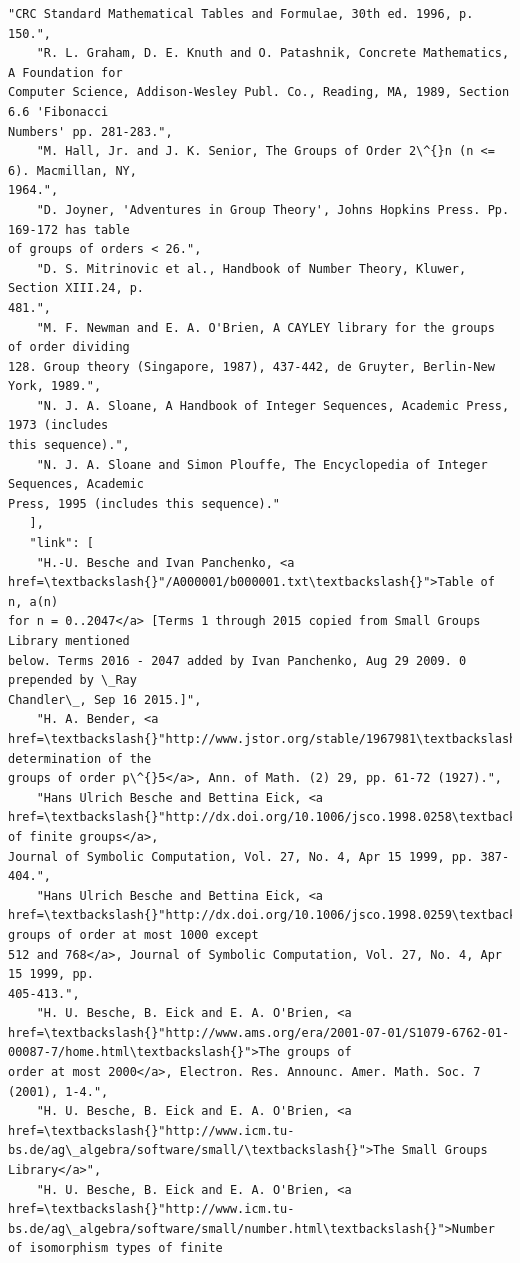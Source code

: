 \documentclass[11pt]{article}
\begin{document}
\begin{Verbatim}[commandchars=\\\{\}]
    "CRC Standard Mathematical Tables and Formulae, 30th ed. 1996, p. 150.",
    "R. L. Graham, D. E. Knuth and O. Patashnik, Concrete Mathematics, A Foundation for
Computer Science, Addison-Wesley Publ. Co., Reading, MA, 1989, Section 6.6 'Fibonacci
Numbers' pp. 281-283.",
    "M. Hall, Jr. and J. K. Senior, The Groups of Order 2\^{}n (n <= 6). Macmillan, NY,
1964.",
    "D. Joyner, 'Adventures in Group Theory', Johns Hopkins Press. Pp. 169-172 has table
of groups of orders < 26.",
    "D. S. Mitrinovic et al., Handbook of Number Theory, Kluwer, Section XIII.24, p.
481.",
    "M. F. Newman and E. A. O'Brien, A CAYLEY library for the groups of order dividing
128. Group theory (Singapore, 1987), 437-442, de Gruyter, Berlin-New York, 1989.",
    "N. J. A. Sloane, A Handbook of Integer Sequences, Academic Press, 1973 (includes
this sequence).",
    "N. J. A. Sloane and Simon Plouffe, The Encyclopedia of Integer Sequences, Academic
Press, 1995 (includes this sequence)."
   ],
   "link": [
    "H.-U. Besche and Ivan Panchenko, <a href=\textbackslash{}"/A000001/b000001.txt\textbackslash{}">Table of n, a(n)
for n = 0..2047</a> [Terms 1 through 2015 copied from Small Groups Library mentioned
below. Terms 2016 - 2047 added by Ivan Panchenko, Aug 29 2009. 0 prepended by \_Ray
Chandler\_, Sep 16 2015.]",
    "H. A. Bender, <a href=\textbackslash{}"http://www.jstor.org/stable/1967981\textbackslash{}">A determination of the
groups of order p\^{}5</a>, Ann. of Math. (2) 29, pp. 61-72 (1927).",
    "Hans Ulrich Besche and Bettina Eick, <a
href=\textbackslash{}"http://dx.doi.org/10.1006/jsco.1998.0258\textbackslash{}">Construction of finite groups</a>,
Journal of Symbolic Computation, Vol. 27, No. 4, Apr 15 1999, pp. 387-404.",
    "Hans Ulrich Besche and Bettina Eick, <a
href=\textbackslash{}"http://dx.doi.org/10.1006/jsco.1998.0259\textbackslash{}">The groups of order at most 1000 except
512 and 768</a>, Journal of Symbolic Computation, Vol. 27, No. 4, Apr 15 1999, pp.
405-413.",
    "H. U. Besche, B. Eick and E. A. O'Brien, <a
href=\textbackslash{}"http://www.ams.org/era/2001-07-01/S1079-6762-01-00087-7/home.html\textbackslash{}">The groups of
order at most 2000</a>, Electron. Res. Announc. Amer. Math. Soc. 7 (2001), 1-4.",
    "H. U. Besche, B. Eick and E. A. O'Brien, <a href=\textbackslash{}"http://www.icm.tu-
bs.de/ag\_algebra/software/small/\textbackslash{}">The Small Groups Library</a>",
    "H. U. Besche, B. Eick and E. A. O'Brien, <a href=\textbackslash{}"http://www.icm.tu-
bs.de/ag\_algebra/software/small/number.html\textbackslash{}">Number of isomorphism types of finite

\end{Verbatim}
\end{document}
